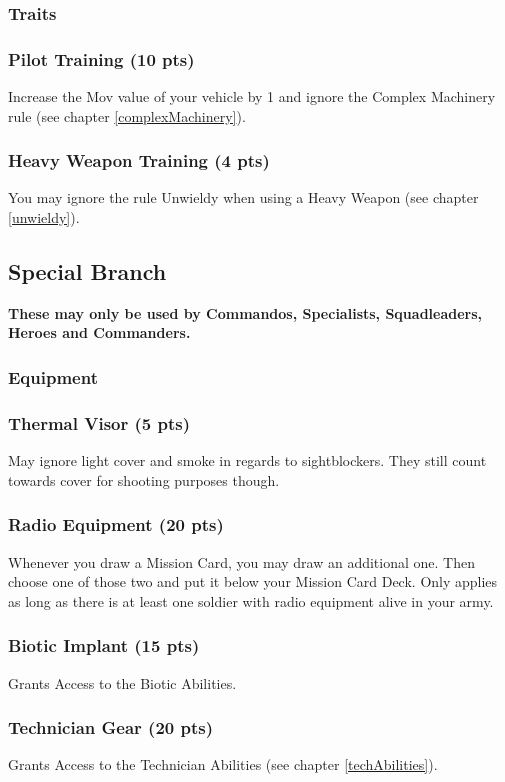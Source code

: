 \documentclass[
	11pt,
	toc=bibliography
	]{article}
\begin{document}
\subsubsection{Traits}
\subsubsection*{Pilot Training (10 pts)}
Increase the Mov value of your vehicle by 1 and ignore the Complex Machinery rule (see chapter \ref{complexMachinery}).

\subsubsection*{Heavy Weapon Training (4 pts)}
You may ignore the rule Unwieldy when using a Heavy Weapon (see chapter \ref{unwieldy}).

\subsection{Special Branch}
\textbf{These may only be used by Commandos, Specialists, Squadleaders, Heroes and Commanders.}
\subsubsection{Equipment}
\subsubsection*{Thermal Visor (5 pts)}
May ignore light cover and smoke in regards to sightblockers. They still count towards cover for shooting purposes though. 

\subsubsection*{Radio Equipment (20 pts)}
Whenever you draw a Mission Card, you may draw an additional one. Then choose one of those two and put it below your Mission Card Deck. Only applies as long as there is at least one soldier with radio equipment alive in your army.

\subsubsection*{Biotic Implant (15 pts)}
Grants Access to the Biotic Abilities.

\subsubsection*{Technician Gear (20 pts)}
Grants Access to the Technician Abilities (see chapter \ref{techAbilities}).
\end{document}
